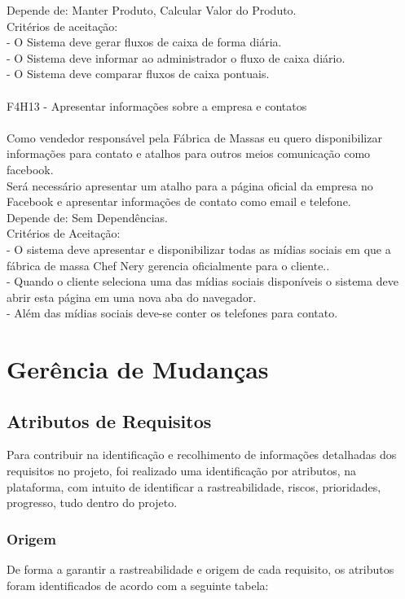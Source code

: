 \tab Depende de: Manter Produto, Calcular Valor do Produto.\\
\tab Critérios de aceitação:\\
\tab - O Sistema deve gerar fluxos de caixa de forma diária.\\
\tab - O Sistema deve informar ao administrador o fluxo de caixa diário.\\
\tab - O Sistema deve comparar fluxos de caixa pontuais.\\
\\
F4H13 - Apresentar informações sobre a empresa e contatos\\
\\
\tab Como vendedor responsável pela Fábrica de Massas eu quero disponibilizar informações para contato e atalhos para outros meios comunicação como facebook.\\
\tab Será necessário apresentar um atalho para a página oficial da empresa no Facebook e apresentar informações de contato como email e telefone.\\
\tab Depende de: Sem Dependências.\\
\tab Critérios de Aceitação:\\
\tab - O sistema deve apresentar e disponibilizar todas as mídias sociais em que a fábrica de massa Chef Nery gerencia oficialmente para o cliente.. \\
\tab - Quando o cliente seleciona uma das mídias sociais disponíveis o sistema deve abrir esta página em uma nova aba do navegador.\\
\tab - Além das mídias sociais deve-se conter os telefones para contato.\\


\section{Gerência de Mudanças}

\subsection {Atributos de Requisitos}

Para  contribuir na identificação e recolhimento de informações detalhadas dos requisitos no projeto, foi realizado uma identificação por atributos, na plataforma, com intuito de identificar a rastreabilidade, riscos, prioridades, progresso, tudo dentro do projeto. \\

\subsubsection{Origem}
De forma a garantir a rastreabilidade e origem de cada requisito, os atributos foram identificados de acordo com a seguinte tabela:\\

